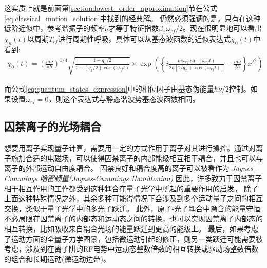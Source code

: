 这实质上就是前面第\ref{section:lowest_order_approximation}节在公式\eqref{eq:classical_motion_solution}中找到的经典解。
仍然必须强调的是，只有在这种低阶近似中，参考谐振子的频率$\nu$才等于特征指数$\beta_x\omega_{rf}/2$。现在很明显地可以看出$\chi_n(t)$以周期$T_{rf}$进行周期性呼吸。具体可以从基态波函数的近似表达式$\chi_0(t)$中看到:
\begin{align}
    \chi_0(t)=\left(\frac{m\nu}{\pi \hbar}\right)^{1/4}\sqrt{\frac{1+q_x/2}{1+(q_x/2)\cos(\omega_{rf}t)}}
    \times \exp\left(\left\{i\frac{m\omega_{rf}\sin(\omega_{rf}t)}{2\hbar\left[1/q_x+\cos(\omega_{rf}t)\right]}-\frac{m\nu}{2\hbar}\right\}x'^2\right)
\end{align}

而公式\eqref{eq:quantum_states_expression}中的相位因子由基态伪能量$\hbar\nu/2$控制。如果设置$\omega_{rf}=0$，则这个表达式与静态谐波势基态波函数相同。



\subsection[囚禁离子的光场耦合]{囚禁离子的光场耦合}

想要用离子实现量子计算，需要用一定的方式作用于离子对其进行操控。通过对离子施加合适的电磁场，可以使得囚禁离子的内部能级相互相干耦合，并且也可以与离子的外部运动自由度耦合。
囚禁良好和耦合度高的离子可以被看作为
\emph{Jaynes-Cummings 哈密顿量(Jaynes-Cummings Hamiltonian)}\cite[]{Janszky_Yushin_1986}
因此，许多致力于囚禁离子相干相互作用的工作都受到这种耦合在量子光学中所起的重要作用的启发。
除了上面这种特殊情况之外，其余多种可能得情况下会涉及到多个运动量子之间的相互交换，类似于量子光学中的多光子跃迁。
此外，原子-光子耦合中隐含的能量守恒不必局限在囚禁离子的内部态和运动态之间的转换，也可以实现囚禁离子内部态的相互转换，比如吸收来自耦合光场的能量跃迁到更高的能级上。
最后，如果考虑了运动方面的全量子力学图景，包括微运动引起的修正，则另一类跃迁可能需要被考虑，涉及到在离子阱的RF电势中运动态整数倍数的相互转换或驱动场整数倍数的组合和长期运动(微运动边带)。

